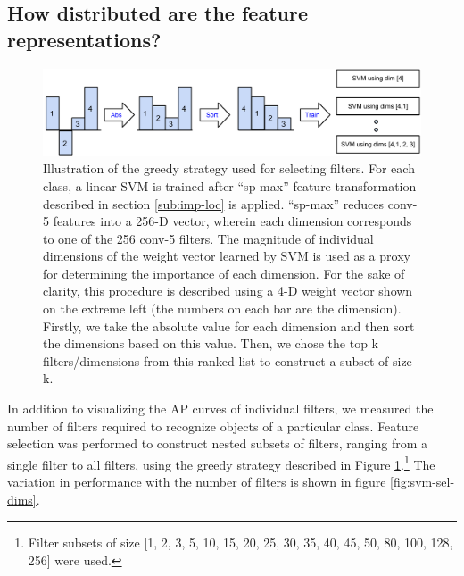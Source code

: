 \subsection{How distributed are the feature representations?}
\label{sub:how-many}
\begin{figure}[t!]
\centering
\includegraphics[scale=0.35]{images/how-many.pdf}
\caption{Illustration of the greedy strategy used for selecting filters. For each class, a linear SVM is trained after ``sp-max'' feature transformation described in section \ref{sub:imp-loc} is applied. ``sp-max''  reduces conv-5 features into a 256-D vector, wherein each dimension corresponds to one of the 256 conv-5 filters. The magnitude of individual dimensions of the weight vector learned by SVM is used as a proxy for determining the importance of each dimension. For the sake of clarity, this procedure is described using a 4-D weight vector shown on the extreme left (the numbers on each bar are the dimension). Firstly, we take the absolute value for each dimension and then sort the dimensions based on this value. Then, we chose the top k filters/dimensions from this ranked list to construct a subset of size k.}
\label{fig:sel-strategy}
\end{figure}

In addition to visualizing the AP curves of individual filters, we measured the number of filters required to recognize objects of a particular class.
Feature selection was performed to construct nested subsets of filters, ranging from a single filter to all filters, using the greedy strategy described in Figure \ref{fig:sel-strategy}.\footnote{Filter subsets of size [1, 2, 3, 5, 10, 15, 20, 25, 30, 35, 40, 45, 50, 80, 100, 128, 256] were used.}
The variation in performance with the number of filters is shown in figure \ref{fig:svm-sel-dims}. 

